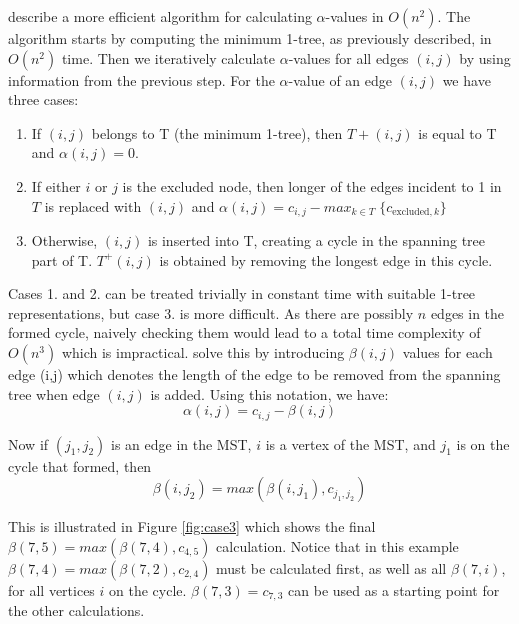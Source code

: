 \documentclass[english, 12pt, a4paper, sci, utf8, a-1b, online]{aaltothesis}
\begin{document}
\cite{HELSGAUN2000106} describe a more efficient algorithm for calculating $\alpha$-values in $O(n^2)$. The algorithm starts by computing the minimum 1-tree, as previously described, in $O(n^2)$ time. Then we iteratively calculate $\alpha$-values for all edges $(i, j)$ by using information from the previous step. For the $\alpha$-value of an edge $(i, j)$ we have three cases:
\begin{enumerate}
    \item If $(i, j)$ belongs to T (the minimum 1-tree), then $T+(i, j)$ is equal to T and $\alpha(i, j) = 0$.
    \item If either $i$ or $j$ is the excluded node, then longer of the edges incident to 1 in $T$ is replaced with $(i, j)$ and $\alpha(i, j) = c_{i, j} - max_{k \in T} \;  \{c_{\text{excluded}, k}\}$
    \item Otherwise, $(i, j)$ is inserted into T, creating a cycle in the spanning tree part of T. $T^+(i,j)$ is obtained by removing the longest edge in this cycle.
\end{enumerate}

Cases 1. and 2. can be treated trivially in constant time with suitable 1-tree representations, but case 3. is more difficult. As there are possibly $n$ edges in the formed cycle, naively checking them would lead to a total time complexity of $O(n^3)$ which is impractical. \cite{HELSGAUN2000106} solve this by introducing $\beta(i, j)$ values for each edge (i,j) which denotes the length of the edge to be removed from the spanning tree when edge $(i, j)$ is added. Using this notation, we have:
\begin{equation} \label{eq:2}
	\alpha(i, j) = c_{i, j} - \beta(i, j)
\end{equation}

Now if $(j_1, j_2)$ is an edge in the MST, $i$ is a vertex of the MST, and $j_1$ is on the cycle that formed, then 
\begin{equation} \label{eq:3}
	\beta(i, j_2) = max(\beta(i, j_1), c_{j_1, j_2})
\end{equation} 

This is illustrated in Figure \ref{fig:case3} which shows the final $\beta (7, 5) = max(\beta(7, 4), c_{4, 5})$ calculation. Notice that in this example $\beta(7, 4) = max(\beta(7, 2), c_{2, 4})$ must be calculated first, as well as all $\beta(7, i)$, for all vertices $i$ on the cycle. $\beta(7, 3) = c_{7, 3}$ can be used as a starting point for the other calculations.
\end{document}
